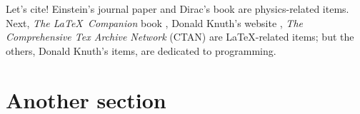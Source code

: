 \documentclass[11pt]{article}
\begin{document}
\lipsum[3]
Let's cite! Einstein's journal paper \cite{einstein} and Dirac's book \cite{dirac} are physics-related items. Next, \textit{The \LaTeX\ Companion} book \cite{latexcompanion}, Donald Knuth's website \cite{knuthwebsite}, \textit{The Comprehensive Tex Archive Network} (CTAN) \cite{ctan} are \LaTeX-related items; but the others, Donald Knuth's items, \cite{knuth-fa,knuth-acp} are dedicated to programming.

\section{Another section}
\lipsum[4]

\printbibliography
\pagebreak



\end{document}
